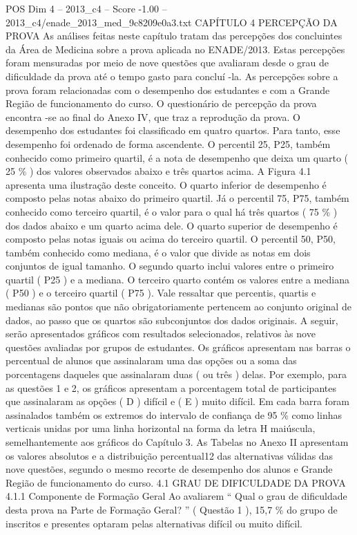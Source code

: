 \begin{textsample}{POS Dim 4 – 2013\_c4 – Score -1.00 – 2013\_c4/enade\_2013\_med\_9c8209e0a3.txt}  \label{ex:f4_pos_234}
CAPÍTULO 4 PERCEPÇÃO DA PROVA As análises feitas neste capítulo tratam das percepções dos concluintes da Área de Medicina sobre a prova aplicada no ENADE/2013.
Estas percepções foram mensuradas por meio de nove questões que avaliaram desde o grau de dificuldade da prova até o tempo gasto para concluí -la.
As percepções sobre a prova foram relacionadas com o desempenho dos estudantes e com a Grande Região de funcionamento do curso.
O questionário de percepção da prova encontra -se ao final do Anexo IV, que traz a reprodução da prova.
O desempenho dos estudantes foi classificado em quatro quartos.
Para tanto, esse desempenho foi ordenado de forma ascendente.
O percentil 25, P25, também conhecido como primeiro quartil, é a nota de desempenho que deixa um quarto ( 25 \% ) dos valores observados abaixo e três quartos acima.
A Figura 4.1 apresenta uma ilustração deste conceito.
O quarto inferior de desempenho é composto pelas notas abaixo do primeiro quartil.
Já o percentil 75, P75, também conhecido como terceiro quartil, é o valor para o qual há três quartos ( 75 \% ) dos dados abaixo e um quarto acima dele.
O quarto superior de desempenho é composto pelas notas iguais ou acima do terceiro quartil.
O percentil 50, P50, também conhecido como mediana, é o valor que divide as notas em dois conjuntos de igual tamanho.
O segundo quarto inclui valores entre o primeiro quartil ( P25 ) e a mediana.
O terceiro quarto contém os valores entre a mediana ( P50 ) e o terceiro quartil ( P75 ).
Vale ressaltar que percentis, quartis e medianas são pontos que não obrigatoriamente pertencem ao conjunto original de dados, ao passo que os quartos são subconjuntos dos dados originais.
A seguir, serão apresentados gráficos com resultados selecionados, relativos às nove questões avaliadas por grupos de estudantes.
Os gráficos apresentam nas barras o percentual de alunos que assinalaram uma das opções ou a soma das porcentagens daqueles que assinalaram duas ( ou três ) delas.
Por exemplo, para as questões 1 e 2, os gráficos apresentam a porcentagem total de participantes que assinalaram as opções ( D ) difícil e ( E ) muito difícil.
Em cada barra foram assinalados também os extremos do intervalo de confiança de 95 \% como linhas verticais unidas por uma linha horizontal na forma da letra H maiúscula, semelhantemente aos gráficos do Capítulo 3.
As Tabelas no Anexo II apresentam os valores absolutos e a distribuição percentual12 das alternativas válidas das nove questões, segundo o mesmo recorte de desempenho dos alunos e Grande Região de funcionamento do curso. 4.1 GRAU DE DIFICULDADE DA PROVA 4.1.1 Componente de Formação Geral Ao avaliarem “ Qual o grau de dificuldade desta prova na Parte de Formação Geral? ” ( Questão 1 ), 15,7 \% do grupo de inscritos e presentes optaram pelas alternativas difícil ou muito difícil.

\end{textsample}
